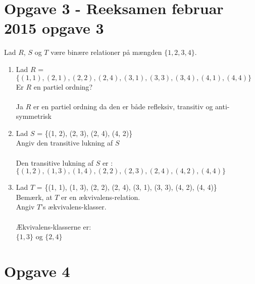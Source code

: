 \documentclass[20pt]{article}
\begin{document}
	\section*{Opgave 3 - Reeksamen februar 2015 opgave 3}
Lad \(R\), \(S\) og \(T\) være binære relationer på mængden \(\{1, 2, 3, 4\}\).
\begin{enumerate}[label=(\alph*)]
	\item 
	Lad \(R\) = \(\{(1, 1), (2, 1), (2, 2), (2, 4), (3, 1), (3, 3), (3, 4), (4, 1), (4, 4)\}\)\\
	Er \(R\) en partiel ordning?\\ \\
	Ja \(R\) er en partiel ordning da den er både refleksiv, transitiv og anti-symmetrisk\\
	\item
	Lad \(S\) = \{(1, 2), (2, 3), (2, 4), (4, 2)\}\\
	Angiv den transitive lukning af \(S\) \\ \\
	Den transitive lukning af \(S\) er : \\
	\(\{(1, 2), (1, 3), (1, 4), (2, 2), (2, 3), (2, 4), (4, 2), (4, 4)\}\)\\
	\item
	Lad \(T\) = \{(1, 1), (1, 3), (2, 2), (2, 4), (3, 1), (3, 3), (4, 2), (4, 4)\}\\
	Bemærk, at \(T\) er en ækvivalens-relation.\\
	Angiv \(T\)'s ækvivalens-klasser.\\ \\
	Ækvivalens-klasserne er:\\
	\(\{1, 3\}\) og \(\{2, 4\}\)\\
\end{enumerate}
	
\newpage	
\section*{Opgave 4}
	

	
	
	
	
\end{document}
